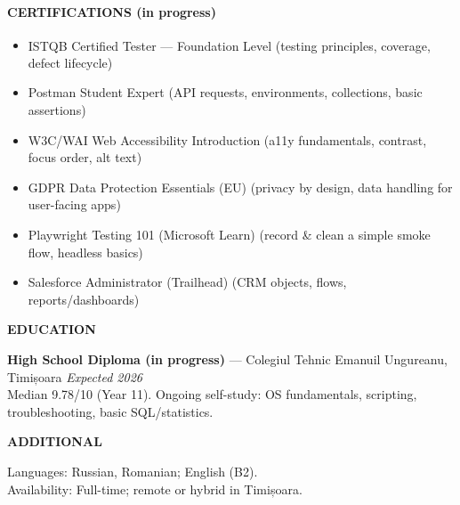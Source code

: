 \documentclass[11pt,a4paper]{article}
\newcommand{\sectionheader}[1]{\vspace{6pt}\textbf{\large #1}\par\vspace{4pt}}
\begin{document}
\sectionheader{CERTIFICATIONS \textnormal{(in progress)}}
\begin{itemize}
  \item ISTQB\textsuperscript{\textregistered} Certified Tester --- Foundation Level (testing principles, coverage, defect lifecycle)
  \item Postman Student Expert (API requests, environments, collections, basic assertions)
  \item W3C/WAI Web Accessibility Introduction (a11y fundamentals, contrast, focus order, alt text)
  \item GDPR Data Protection Essentials (EU) (privacy by design, data handling for user-facing apps)
  \item Playwright Testing 101 (Microsoft Learn) (record \& clean a simple smoke flow, headless basics)
  \item Salesforce Administrator (Trailhead) (CRM objects, flows, reports/dashboards) %
\end{itemize}

\sectionheader{EDUCATION}
\textbf{High School Diploma (in progress)} --- Colegiul Tehnic Emanuil Ungureanu, Timișoara \hfill \textit{Expected 2026}\\
Median 9.78/10 (Year 11). Ongoing self-study: OS fundamentals, scripting, troubleshooting, basic SQL/statistics.

\sectionheader{ADDITIONAL}
Languages: Russian, Romanian; English (B2).\\
Availability: Full-time; remote or hybrid in Timișoara.
\end{document}
